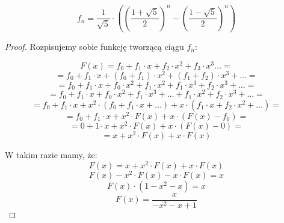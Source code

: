 \begin{theorem}
	\begin{equation}
		f_n = \frac{1}{\sqrt{5}} \cdot \left( \left(\frac{1 + \sqrt{5}}{2}\right)^{n} - \left(\frac{1 - \sqrt{5}}{2}\right)^{n} \right)
	\end{equation}
\end{theorem}

\begin{proof}
	Rozpisujemy sobie funkcję tworzącą ciągu \(f_n\):

	\begin{equation*}
		F(x) = f_0 + f_1 \cdot x + f_2 \cdot x^2 + f_3 \cdot x^3 \dots =
	\end{equation*}
	\begin{equation*}
		= f_0 + f_1 \cdot x + (f_0 + f_1) \cdot x^2 + (f_1 + f_2) \cdot x^3 + \dots =
	\end{equation*}
	\begin{equation*}
		= f_0 + f_1 \cdot x + f_0 \cdot x^2 + f_1 \cdot x^2 + f_1 \cdot x^3 + f_2 \cdot x^3 + \dots =
	\end{equation*}
	\begin{equation*}
		= f_0 + f_1 \cdot x + f_0 \cdot x^2 + f_1 \cdot x^3 + \dots + f_1 \cdot x^2 +  f_2 \cdot x^3 + \dots =
	\end{equation*}
	\begin{equation*}
		= f_0 + f_1 \cdot x + x^2 \cdot (f_0 + f_1 \cdot x + \dots) + x \cdot (f_1 \cdot x +  f_2 \cdot x^2 + \dots) =
	\end{equation*}
	\begin{equation*}
		= f_0 + f_1 \cdot x + x^2 \cdot F(x) + x \cdot (F(x) - f_0) =
	\end{equation*}
	\begin{equation*}
		= 0 + 1 \cdot x + x^2 \cdot F(x) + x \cdot (F(x) - 0) =
	\end{equation*}
	\begin{equation*}
		= x + x^2 \cdot F(x) + x \cdot F(x)
	\end{equation*}

	W takim razie mamy, że:
	\begin{equation*}
		F(x) = x + x^2 \cdot F(x) + x \cdot F(x)
	\end{equation*}
	\begin{equation*}
		F(x) -  x^2 \cdot F(x) - x \cdot F(x)  = x
	\end{equation*}
	\begin{equation*}
		F(x) \cdot (1 - x^2 - x) = x
	\end{equation*}
	\begin{equation*}
		F(x) = \frac{x}{-x^2 -x + 1}
	\end{equation*}


\end{proof}
